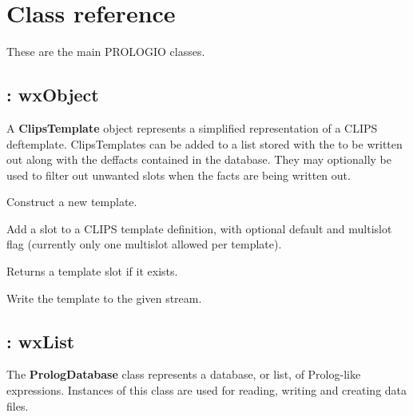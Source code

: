 \chapter{Class reference}
%
\setfooter{\thepage}{}{}{}{}{\thepage}

These are the main PROLOGIO classes.

\section{: wxObject}

A {\bf ClipsTemplate} object represents a simplified representation of a
CLIPS deftemplate. ClipsTemplates can be added to a list stored with the
 to be written out along with the deffacts contained
in the database.  They may optionally be used to filter out unwanted
slots when the facts are being written out.



Construct a new template.



Add a slot to a CLIPS template definition, with optional default and
multislot flag (currently only one multislot allowed per template).



Returns a template slot if it exists.



Write the template to the given stream.

\section{: wxList}

The {\bf PrologDatabase} class represents a database, or list,
of Prolog-like expressions.  Instances of this class are used for reading,
writing and creating data files.

